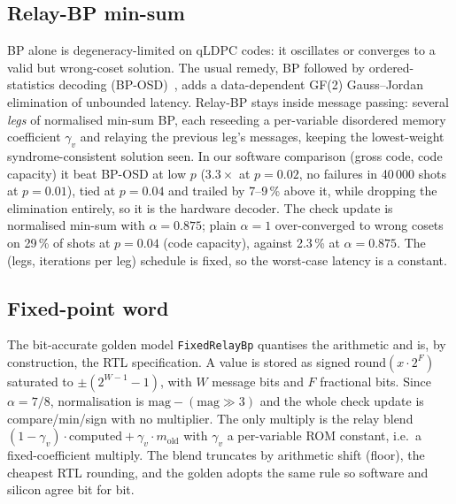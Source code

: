 \subsection*{Relay-BP min-sum}

BP alone is degeneracy-limited on qLDPC codes: it oscillates or converges to a
valid but wrong-coset solution. The usual remedy, BP followed by
ordered-statistics decoding (BP-OSD)~\citep{panteleev2021bposd}, adds a
data-dependent GF(2) Gauss--Jordan elimination of unbounded latency. Relay-BP
\citep{muller2025relaybp} stays inside message passing: several \emph{legs} of
normalised min-sum BP, each reseeding a per-variable disordered memory
coefficient $\gamma_v$ and relaying the previous leg's messages, keeping the
lowest-weight syndrome-consistent solution seen. In our software comparison
(gross code, code capacity) it beat BP-OSD at low $p$ ($3.3\times$ at
$p=0.02$, no failures in 40\,000 shots at $p=0.01$), tied at $p=0.04$ and
trailed by 7--9\,\% above it, while dropping the elimination entirely, so it
is the hardware decoder.
The check update is normalised min-sum with $\alpha=0.875$; plain $\alpha=1$
over-converged to wrong cosets on 29\,\% of shots at $p=0.04$ (code capacity),
against 2.3\,\% at $\alpha=0.875$. The (legs, iterations per leg) schedule is
fixed, so the worst-case latency is a constant.

\subsection*{Fixed-point word}

The bit-accurate golden model \texttt{FixedRelayBp} quantises the arithmetic
and is, by construction, the RTL specification.
A value is stored as signed $\mathrm{round}(x\cdot2^F)$ saturated to
$\pm(2^{W-1}-1)$, with $W$ message bits and $F$ fractional bits. Since
$\alpha=7/8$, normalisation is $\mathrm{mag}-(\mathrm{mag}\gg3)$ and the whole
check update is compare/min/sign with no multiplier. The only multiply is the
relay blend $(1-\gamma_v)\cdot\mathrm{computed}+\gamma_v\cdot
m_{\mathrm{old}}$ with $\gamma_v$ a per-variable ROM constant, i.e.\ a
fixed-coefficient multiply. The blend truncates by arithmetic shift (floor),
the cheapest RTL rounding, and the golden adopts the same rule so software and
silicon agree bit for bit.

